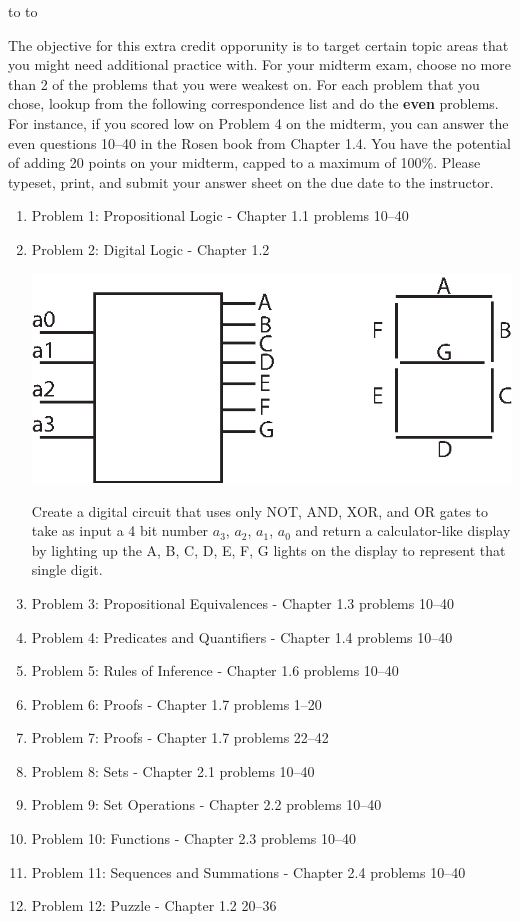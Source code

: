 \documentclass[10pt]{article}
\newcommand{\handout}{
   \renewcommand{\thepage}{H\hnumber-\arabic{page}}
   \noindent
   \begin{center}
      \vbox{
    \hbox to \columnwidth {\sc{\course} --- \prof \hfill}
    \vspace{-2mm}
    \hbox to \columnwidth {\sc due \MakeLowercase{\duedate} \duelocation\hfill {\Huge\color{mdb}\hnumber.}}
	\vspace{15pt}
	{\Huge\yourname}
      }
   \end{center}
   \vspace*{2mm}
}
\begin{document}
\thispagestyle{empty}
\handout

The objective for this extra credit opporunity is to target certain topic areas that you might need additional practice with. For your midterm exam, choose no more than 2 of the problems that you were weakest on. For each problem that you chose, lookup from the following correspondence list and do the \textbf{even} problems. For instance, if you scored low on Problem 4 on the midterm, you can answer the even questions 10--40  in the Rosen book from Chapter 1.4. You have the potential of adding 20 points on your midterm, capped to a maximum of 100\%. Please typeset, print, and submit your answer sheet on the due date to the instructor.

\begin{enumerate}
\item Problem 1: Propositional Logic - Chapter 1.1 problems 10--40
\item Problem 2: Digital Logic - Chapter 1.2 

\includegraphics{calcdisplay.eps}

Create a digital circuit that uses only NOT, AND, XOR, and OR gates to take as input a 4 bit number $a_3$,  $a_2$,   $a_1$,   $a_0$ and return a calculator-like display by lighting up the A, B, C, D, E, F, G lights on the display to represent that single digit.



\item Problem 3: Propositional Equivalences - Chapter 1.3 problems  10--40
\item Problem 4: Predicates and Quantifiers - Chapter 1.4 problems  10--40
\item Problem 5: Rules of Inference - Chapter 1.6 problems  10--40
\item Problem 6: Proofs - Chapter 1.7 problems  1--20
\item Problem 7: Proofs - Chapter 1.7 problems  22--42
\item Problem 8: Sets - Chapter 2.1 problems  10--40
\item Problem 9: Set Operations - Chapter 2.2 problems  10--40
\item Problem 10: Functions - Chapter 2.3 problems  10--40
\item Problem 11: Sequences and Summations - Chapter 2.4 problems  10--40
\item Problem 12: Puzzle - Chapter 1.2 20--36
\end{enumerate}
\end{document}
